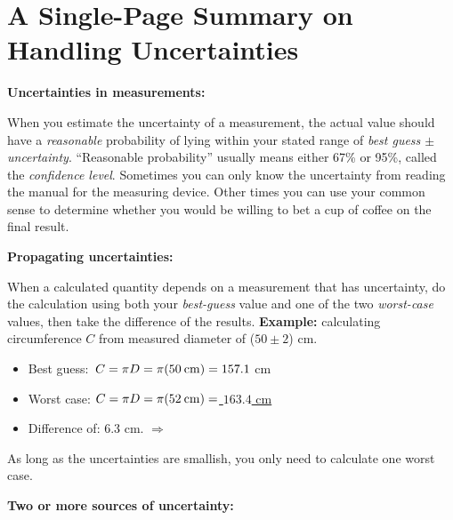 \section{A Single-Page Summary on Handling Uncertainties}
\label{uncertainty}

\textbf{Uncertainties in measurements:}
\vspace{-.8\parskip}

When you estimate the uncertainty of a measurement, the actual value should have a \textit{reasonable} probability of lying within your stated range of \textit{best guess $\pm$ uncertainty}.  ``Reasonable probability'' usually means either 67\% or 95\%, called the \textit{confidence level}.  Sometimes you can only know the uncertainty from reading the manual for the measuring device.  Other times you can use your common sense to determine whether you would be willing to bet a cup of coffee on the final result.
\vspace{+0.15cm}

\textbf{Propagating uncertainties:}
\vspace{-.8\parskip}

When a calculated quantity depends on a measurement that has uncertainty, do the calculation using both your \textit{best-guess} value and one of the two \textit{worst-case} values, then take the difference of the results.  \textbf{Example:} calculating circumference $C$ from measured diameter of ($50\pm2$) cm.
\begin{itemize}\itemsep1pt
\vspace{-0.35cm}
	\item Best guess: $\,C=\pi D =\pi(50 \:\rm{cm}) = 157.1$ cm
	\item Worst case: $C=\pi D =\pi(52 \:\rm{cm}) =$\underline{ $163.4$  cm}
\vspace{-0.10cm}
	\item Difference of:        \hspace{100pt}                   6.3 cm. $\Longrightarrow$ 
\end{itemize}
\vspace{-0.35cm}
As long as the uncertainties are smallish, you only need to calculate one worst case.
\vspace{+0.15cm}

\textbf{Two or more sources of uncertainty:}
\vspace{-0.8\parskip}

